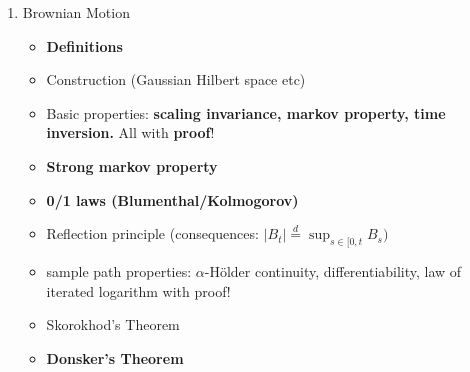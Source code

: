 \documentclass[11pt,a4paper, final]{article}
\theoremstyle{definition}
\begin{document}
\begin{enumerate}
\begin{itemize}
\end{itemize}
\item Brownian Motion
\begin{itemize}
\item \textbf{Definitions}
\item Construction (Gaussian Hilbert space etc)
\item Basic properties: \textbf{scaling invariance, markov property, time inversion.} All with \textbf{proof}!
\item \textbf{Strong markov property}
\item \textbf{0/1 laws (Blumenthal/Kolmogorov)}
\item Reflection principle (consequences: $|B_t| \overset{d}= \sup_{s \in [0,t} B_s)$
\item sample path properties: $\alpha$-Hölder continuity, differentiability, law of iterated logarithm with proof!
\item Skorokhod's Theorem 
\item \textbf{Donsker's Theorem}
\end{itemize}
\end{enumerate}
\end{document}
